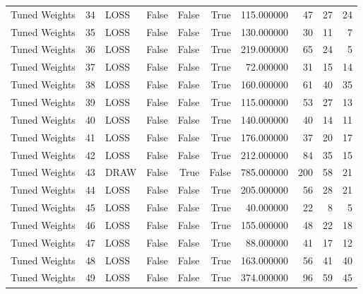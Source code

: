 \begin{table}[htbp]
\begin{tabular}{lrlrrrrrrr}
Tuned Weights & 34 & LOSS & False & False & True & 115.000000 & 47 & 27 & 24 \\
Tuned Weights & 35 & LOSS & False & False & True & 130.000000 & 30 & 11 & 7 \\
Tuned Weights & 36 & LOSS & False & False & True & 219.000000 & 65 & 24 & 5 \\
Tuned Weights & 37 & LOSS & False & False & True & 72.000000 & 31 & 15 & 14 \\
Tuned Weights & 38 & LOSS & False & False & True & 160.000000 & 61 & 40 & 35 \\
Tuned Weights & 39 & LOSS & False & False & True & 115.000000 & 53 & 27 & 13 \\
Tuned Weights & 40 & LOSS & False & False & True & 140.000000 & 40 & 14 & 11 \\
Tuned Weights & 41 & LOSS & False & False & True & 176.000000 & 37 & 20 & 17 \\
Tuned Weights & 42 & LOSS & False & False & True & 212.000000 & 84 & 35 & 15 \\
Tuned Weights & 43 & DRAW & False & True & False & 785.000000 & 200 & 58 & 21 \\
Tuned Weights & 44 & LOSS & False & False & True & 205.000000 & 56 & 28 & 21 \\
Tuned Weights & 45 & LOSS & False & False & True & 40.000000 & 22 & 8 & 5 \\
Tuned Weights & 46 & LOSS & False & False & True & 155.000000 & 48 & 22 & 18 \\
Tuned Weights & 47 & LOSS & False & False & True & 88.000000 & 41 & 17 & 12 \\
Tuned Weights & 48 & LOSS & False & False & True & 163.000000 & 56 & 41 & 40 \\
Tuned Weights & 49 & LOSS & False & False & True & 374.000000 & 96 & 59 & 45 \\
\bottomrule
\end{tabular}

\end{table}
